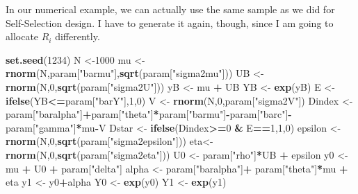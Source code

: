 \documentclass[]{book}
\newenvironment{Shaded}{\begin{snugshade}}{\end{snugshade}}
\newcommand{\DecValTok}[1]{\textcolor[rgb]{0.00,0.00,0.81}{#1}}
\newcommand{\KeywordTok}[1]{\textcolor[rgb]{0.13,0.29,0.53}{\textbf{#1}}}
\newcommand{\NormalTok}[1]{#1}
\newcommand{\OperatorTok}[1]{\textcolor[rgb]{0.81,0.36,0.00}{\textbf{#1}}}
\newcommand{\StringTok}[1]{\textcolor[rgb]{0.31,0.60,0.02}{#1}}
\theoremstyle{definition}
\theoremstyle{definition}
\theoremstyle{definition}
\theoremstyle{remark}
\let\BeginKnitrBlock\begin \let\EndKnitrBlock\end
\begin{document}
\BeginKnitrBlock{example}
\protect\hypertarget{exm:unnamed-chunk-93}{}{\label{exm:unnamed-chunk-93} }In our numerical example, we can actually use the same sample as we did for Self-Selection design.
I have to generate it again, though, since I am going to allocate \(R_i\) differently.
\EndKnitrBlock{example}

\begin{Shaded}
\begin{Highlighting}[]
\KeywordTok{set.seed}\NormalTok{(}\DecValTok{1234}\NormalTok{)}
\NormalTok{N <-}\DecValTok{1000}
\NormalTok{mu <-}\StringTok{ }\KeywordTok{rnorm}\NormalTok{(N,param[}\StringTok{"barmu"}\NormalTok{],}\KeywordTok{sqrt}\NormalTok{(param[}\StringTok{"sigma2mu"}\NormalTok{]))}
\NormalTok{UB <-}\StringTok{ }\KeywordTok{rnorm}\NormalTok{(N,}\DecValTok{0}\NormalTok{,}\KeywordTok{sqrt}\NormalTok{(param[}\StringTok{"sigma2U"}\NormalTok{]))}
\NormalTok{yB <-}\StringTok{ }\NormalTok{mu }\OperatorTok{+}\StringTok{ }\NormalTok{UB }
\NormalTok{YB <-}\StringTok{ }\KeywordTok{exp}\NormalTok{(yB)}
\NormalTok{E <-}\StringTok{ }\KeywordTok{ifelse}\NormalTok{(YB}\OperatorTok{<=}\NormalTok{param[}\StringTok{"barY"}\NormalTok{],}\DecValTok{1}\NormalTok{,}\DecValTok{0}\NormalTok{)}
\NormalTok{V <-}\StringTok{ }\KeywordTok{rnorm}\NormalTok{(N,}\DecValTok{0}\NormalTok{,param[}\StringTok{"sigma2V"}\NormalTok{])}
\NormalTok{Dindex <-}\StringTok{ }\NormalTok{param[}\StringTok{"baralpha"}\NormalTok{]}\OperatorTok{+}\NormalTok{param[}\StringTok{"theta"}\NormalTok{]}\OperatorTok{*}\NormalTok{param[}\StringTok{"barmu"}\NormalTok{]}\OperatorTok{-}\NormalTok{param[}\StringTok{"barc"}\NormalTok{]}\OperatorTok{-}\NormalTok{param[}\StringTok{"gamma"}\NormalTok{]}\OperatorTok{*}\NormalTok{mu}\OperatorTok{-}\NormalTok{V}
\NormalTok{Dstar <-}\StringTok{ }\KeywordTok{ifelse}\NormalTok{(Dindex}\OperatorTok{>=}\DecValTok{0} \OperatorTok{&}\StringTok{ }\NormalTok{E}\OperatorTok{==}\DecValTok{1}\NormalTok{,}\DecValTok{1}\NormalTok{,}\DecValTok{0}\NormalTok{)}
\NormalTok{epsilon <-}\StringTok{ }\KeywordTok{rnorm}\NormalTok{(N,}\DecValTok{0}\NormalTok{,}\KeywordTok{sqrt}\NormalTok{(param[}\StringTok{"sigma2epsilon"}\NormalTok{]))}
\NormalTok{eta<-}\StringTok{ }\KeywordTok{rnorm}\NormalTok{(N,}\DecValTok{0}\NormalTok{,}\KeywordTok{sqrt}\NormalTok{(param[}\StringTok{"sigma2eta"}\NormalTok{]))}
\NormalTok{U0 <-}\StringTok{ }\NormalTok{param[}\StringTok{"rho"}\NormalTok{]}\OperatorTok{*}\NormalTok{UB }\OperatorTok{+}\StringTok{ }\NormalTok{epsilon}
\NormalTok{y0 <-}\StringTok{ }\NormalTok{mu }\OperatorTok{+}\StringTok{  }\NormalTok{U0 }\OperatorTok{+}\StringTok{ }\NormalTok{param[}\StringTok{"delta"}\NormalTok{]}
\NormalTok{alpha <-}\StringTok{ }\NormalTok{param[}\StringTok{"baralpha"}\NormalTok{]}\OperatorTok{+}\StringTok{  }\NormalTok{param[}\StringTok{"theta"}\NormalTok{]}\OperatorTok{*}\NormalTok{mu }\OperatorTok{+}\StringTok{ }\NormalTok{eta}
\NormalTok{y1 <-}\StringTok{ }\NormalTok{y0}\OperatorTok{+}\NormalTok{alpha}
\NormalTok{Y0 <-}\StringTok{ }\KeywordTok{exp}\NormalTok{(y0)}
\NormalTok{Y1 <-}\StringTok{ }\KeywordTok{exp}\NormalTok{(y1)}
\end{Highlighting}
\end{Shaded}
\end{document}
